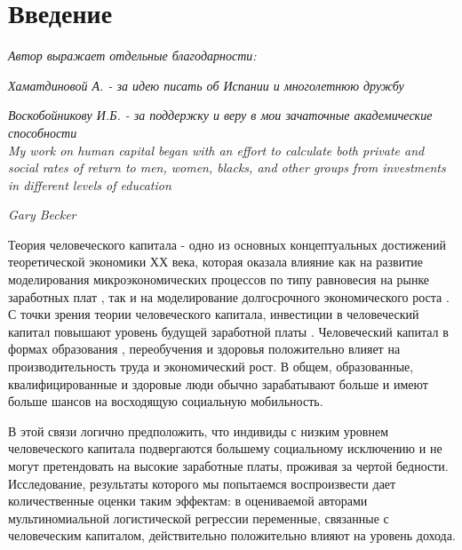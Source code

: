 \documentclass[a4paper]{article}
\begin{document}
\section*{Введение}

\begin{flushright}
	\textit{Автор выражает отдельные благодарности:}
	
		 \textit{Хаматдиновой А. - за идею писать об Испании и многолетнюю дружбу}
		 
		  \textit{Воскобойникову И.Б. - за поддержку и веру в мои зачаточные академические способности}\\
		  
	
	\textit{My work on human capital began with an effort to calculate both private and social rates of return to men, women, blacks, and other groups from investments in different levels of education}
	
	\textit{Gary Becker}
\end{flushright}
Теория человеческого капитала - одно из основных концептуальных достижений теоретической экономики ХХ века, которая оказала влияние как на развитие моделирования микроэкономических процессов по типу равновесия на рынке заработных плат \cite[Becker, 2009]{Beck}, так и на моделирование долгосрочного экономического роста \cite[Romer, 1990]{Rom}. С точки зрения теории человеческого капитала, инвестиции в человеческий капитал повышают уровень будущей заработной платы \cite[Becker, 2009]{Beck}. Человеческий капитал в формах образования \cite[Schultz, 1961]{Schultz}\cite[Becker, 2009]{Beck}, переобучения \cite[Gueron, 2002]{Hamilton} и здоровья \cite[Grossman, 1972]{Grossman} положительно влияет на производительность труда и экономический рост. В общем, образованные, квалифицированные и здоровые люди обычно зарабатывают больше и имеют больше шансов на восходящую социальную мобильность. 

В этой связи логично предположить, что индивиды с низким уровнем человеческого капитала подвергаются большему социальному исключению и не могут претендовать на высокие заработные платы, проживая за чертой бедности. Исследование, результаты которого мы попытаемся воспроизвести \cite[Hong \& Pandey, 2008]{Hong} дает количественные оценки таким эффектам: в оцениваемой авторами мультиномиальной логистической регрессии переменные, связанные с человеческим капиталом, действительно положительно влияют на уровень дохода. 
\end{document}
